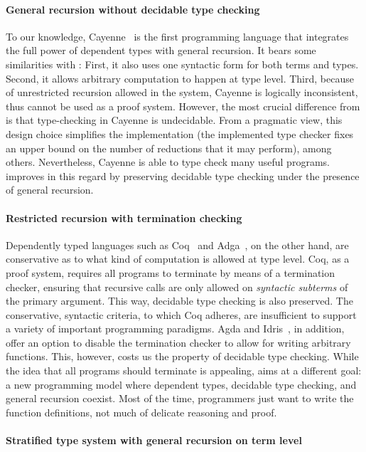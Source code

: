 \paragraph{General recursion without decidable type checking} To our
knowledge, Cayenne~\cite{cayenne} is the first programming language
that integrates the full power of dependent types with general
recursion. It bears some similarities with \name: First, it also uses
one syntactic form for both terms and types. Second, it allows
arbitrary computation to happen at type level. Third, because of
unrestricted recursion allowed in the system, Cayenne is logically
inconsistent, thus cannot be used as a proof system. However, the most
crucial difference from \name is that type-checking in Cayenne is
undecidable. From a pragmatic view, this design choice simplifies the
implementation (the implemented type checker fixes an upper bound on
the number of reductions that it may perform), among
others. Nevertheless, Cayenne is able to type check many useful
programs. \name improves in this regard by preserving decidable type
checking under the presence of general recursion.


\paragraph{Restricted recursion with termination checking}

Dependently typed languages such as Coq~\cite{coqsite} and
Adga~\cite{agda}, on the other hand, are conservative as to what kind
of computation is allowed at type level. Coq, as a proof system,
requires all programs to terminate by means of a termination checker,
ensuring that recursive calls are only allowed on \emph{syntactic
  subterms} of the primary argument. This way, decidable type checking
is also preserved. The conservative, syntactic criteria, to which Coq
adheres, are insufficient to support a variety of important
programming paradigms. Agda and Idris~\cite{idris}, in addition, offer
an option to disable the termination checker to allow for writing
arbitrary functions. This, however, costs us the property of decidable
type checking. While the idea that all programs should terminate is
appealing, \name aims at a different goal: a new programming model
where dependent types, decidable type checking, and general recursion
coexist. Most of the time, programmers just want to write the function
definitions, not much of delicate reasoning and proof.

\paragraph{Stratified type system with general recursion on term level}

